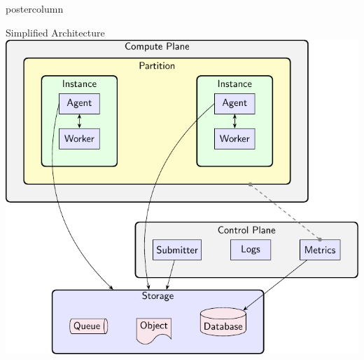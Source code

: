 \begin{frame}[fragile]
  \begin{columns}[T]
    \begin{column}{.49\textwidth}
      \begin{beamercolorbox}[center,wd=\textwidth]{postercolumn}
        \begin{minipage}[T]{.96\textwidth}
            
            \begin{block}{Simplified Architecture}
            \centering
            \includegraphics[scale=1.5]{armonik_architecture.pdf}
            \end{block}


\end{minipage}
\end{beamercolorbox}
\end{column}
\end{columns}
\end{frame}
